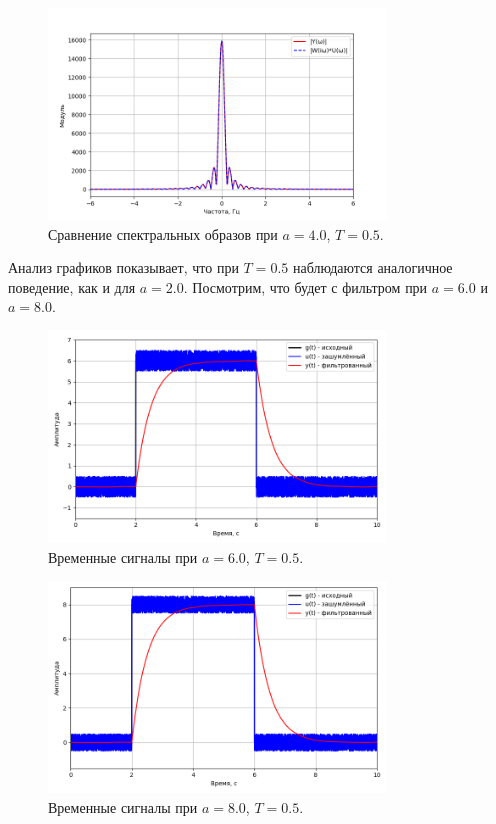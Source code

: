 \documentclass[a4paper]{article}
\begin{document}
\begin{figure}[H]
  \centering
  \includegraphics[width=0.8\textwidth]{src/task_1_1/spec_comp_4.0_0.5.png}
  \caption{Сравнение спектральных образов при \(a=4.0\), \(T=0.5\).}
\end{figure}
\noindent Анализ графиков показывает, что при \(T=0.5\) наблюдаются аналогичное поведение, как и для \(a=2.0\). Посмотрим, что будет с фильтром при \(a=6.0\) и \(a=8.0\).

\begin{figure}[H]
  \centering
  \includegraphics[width=0.8\textwidth]{src/task_1_1/time_6.0_0.5.png}
  \caption{Временные сигналы при $a = 6.0$, $T = 0.5$.}
\end{figure}

\begin{figure}[H]
  \centering
  \includegraphics[width=0.8\textwidth]{src/task_1_1/time_8.0_0.5.png}
  \caption{Временные сигналы при \(a=8.0\), \(T=0.5\).}
\end{figure}
\end{document}

